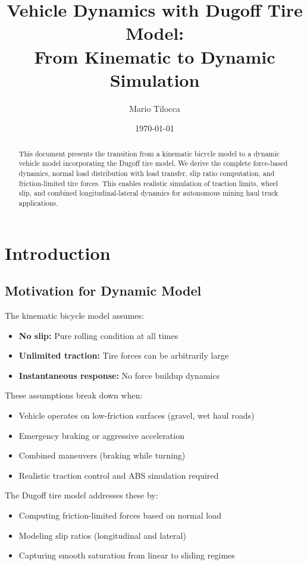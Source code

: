 \documentclass[11pt,a4paper]{article}
\title{Vehicle Dynamics with Dugoff Tire Model:\\
From Kinematic to Dynamic Simulation}
\author{Mario Tilocca}
\date{\today}
\begin{document}
\maketitle

\begin{abstract}
This document presents the transition from a kinematic bicycle model to a dynamic vehicle model incorporating the Dugoff tire model. We derive the complete force-based dynamics, normal load distribution with load transfer, slip ratio computation, and friction-limited tire forces. This enables realistic simulation of traction limits, wheel slip, and combined longitudinal-lateral dynamics for autonomous mining haul truck applications.
\end{abstract}

\tableofcontents
\clearpage

\section{Introduction}

\subsection{Motivation for Dynamic Model}

The kinematic bicycle model assumes:
\begin{itemize}
    \item \textbf{No slip:} Pure rolling condition at all times
    \item \textbf{Unlimited traction:} Tire forces can be arbitrarily large
    \item \textbf{Instantaneous response:} No force buildup dynamics
\end{itemize}

These assumptions break down when:
\begin{itemize}
    \item Vehicle operates on low-friction surfaces (gravel, wet haul roads)
    \item Emergency braking or aggressive acceleration
    \item Combined maneuvers (braking while turning)
    \item Realistic traction control and ABS simulation required
\end{itemize}

The Dugoff tire model addresses these by:
\begin{itemize}
    \item Computing friction-limited forces based on normal load
    \item Modeling slip ratios (longitudinal and lateral)
    \item Capturing smooth saturation from linear to sliding regimes
\end{itemize}
\end{document}
